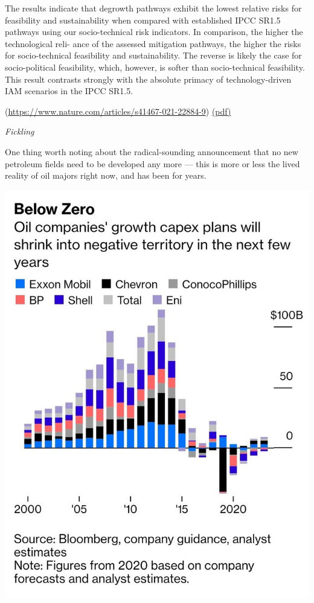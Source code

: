 \documentclass[
]{book}
\begin{document}
The results indicate that degrowth pathways exhibit the lowest
relative risks for feasibility and sustainability when compared
with established IPCC SR1.5 pathways using our socio-technical
risk indicators. In comparison, the higher the technological reli-
ance of the assessed mitigation pathways, the higher the risks for
socio-technical feasibility and sustainability. The reverse is likely
the case for socio-political feasibility, which, however, is softer
than socio-technical feasibility. This result contrasts strongly with
the absolute primacy of technology-driven IAM scenarios in the
IPCC SR1.5.

\citep[ 1.5 °C degrowth scenarios suggest the need for new mitigation pathways]{LorenzClimate}(\url{https://www.nature.com/articles/s41467-021-22884-9})
\href{pdf/Keyser_2021_New_Mitigation_Pathways.pdf}{(pdf)}

\emph{Fickling}

One thing worth noting about the radical-sounding \citet{iea}
announcement that no new petroleum fields need to be developed any more --- this is more or less the lived reality of oil majors right now, and has been for years.

\includegraphics{fig/big_oil_investments.jpeg}
\end{document}
